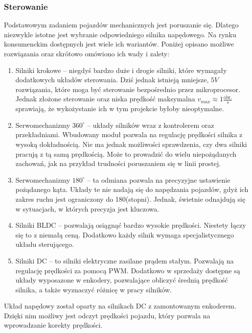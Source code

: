         \subsubsection{Sterowanie}
        \label{sec:engines}
            Podstawowym zadaniem pojazdów mechanicznych jest poruszanie się.
            Dlatego niezwykle istotne jest wybranie odpowiedniego silnika napędowego.
            Na rynku konsumenckim dostępnych jest wiele ich wariantów.
            Poniżej opisano możliwe rozwiązania oraz skrótowo omówiono ich wady i zalety:
            \begin{enumerate}
                \item Silniki krokowe -- niegdyś bardzo duże i drogie silniki, które wymagały dodatkowych układów sterowania.
                Dziś jednak istnieją mniejsze, $5V$ rozwiązania, które moga być sterowanie bezpośrednio przez mikroprocesor.
                Jednak złożone sterowanie oraz niska prędkość maksymalna $v_{max} \approx 1 \frac{\text{obr.}}{s}$ sprawiają, że wykożystanie ich w tym projekcie byłoby nieoptymalne.
                \item Serwomechanizmy $360^\circ$ -- układy silników wraz z kontrolerem oraz przekładniami. Wbudowany moduł pozwala na regulację prędkości silnika z wysoką dokładnością.
                Nie ma jednak możliwości sprawdzenia, czy dwa silniki pracują z tą samą prędkością. Może to prowadzić do wielu niepożądanych zachowań, jak na przykład trudności poruszaniem się w linii prostej.
                \item Serwomechanizmy $180^\circ$ -- ta odmiana pozwala na precyzyjne ustawienie pożądanego kąta.
                Układy te nie nadają się do napędzania pojazdów, gdyż ich zakres ruchu jest ograniczony do 180(stopni). Jednak, świetnie odnajdują się w sytuacjach, w których precyzja jest kluczowa.
                \item Silniki BLDC -- pozwalają osiągnąć bardzo wysokie prędkości.
                Niestety łączy się to z niemałą ceną. Dodatkowo każdy silnik wymaga specjalistycznego układu sterującego.
                \item Silniki DC -- to silniki elektryczne zasilane prądem stałym. Pozwalają na regulację prędkości za pomocą PWM.
                Dodatkowo w sprzedaży dostępne są układy wyposazone w enkodery, pozwalające obliczyć średnią prędkość silnika,
                a także wyznaczyć różnicę w pracy silników.
            \end{enumerate}
            Układ napędowy został oparty na silnikach DC z zamontowanym enkoderem. Dzięki nim możliwy jest odczyt prędkości pojazdu, który pozwala na wprowadzanie korekty prędkości.
